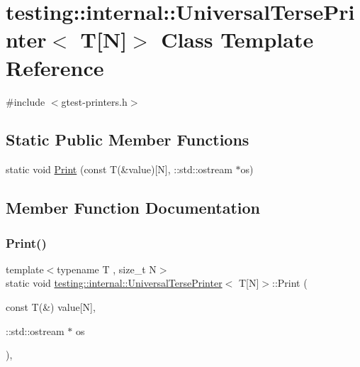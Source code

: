 \hypertarget{classtesting_1_1internal_1_1_universal_terse_printer_3_01_t[_n]_4}{}\section{testing\+::internal\+::Universal\+Terse\+Printer$<$ T\mbox{[}N\mbox{]}$>$ Class Template Reference}
\label{classtesting_1_1internal_1_1_universal_terse_printer_3_01_t[_n]_4}


{\ttfamily \#include $<$gtest-\/printers.\+h$>$}

\subsection*{Static Public Member Functions}
\begin{DoxyCompactItemize}
\item 
static void \mbox{\hyperlink{classtesting_1_1internal_1_1_universal_terse_printer_3_01_t[_n]_4_a9e0ceb62fda7dc46ebcf5f911e459a49}{Print}} (const T(\&value)\mbox{[}N\mbox{]}, \+::std\+::ostream $\ast$os)
\end{DoxyCompactItemize}


\subsection{Member Function Documentation}
\mbox{\label{classtesting_1_1internal_1_1_universal_terse_printer_3_01_t[_n]_4_a9e0ceb62fda7dc46ebcf5f911e459a49}} 
\subsubsection{\texorpdfstring{Print()}{Print()}}
{\footnotesize\ttfamily template$<$typename T , size\+\_\+t N$>$ \\
static void \mbox{\hyperlink{classtesting_1_1internal_1_1_universal_terse_printer}{testing\+::internal\+::\+Universal\+Terse\+Printer}}$<$ T\mbox{[}N\mbox{]}$>$\+::Print (\begin{DoxyParamCaption}\item[{const T(\&)}]{value\mbox{[}\+N\mbox{]},  }\item[{\+::std\+::ostream $\ast$}]{os }\end{DoxyParamCaption})\hspace{0.3cm}{\ttfamily [inline]}, {\ttfamily [static]}}



